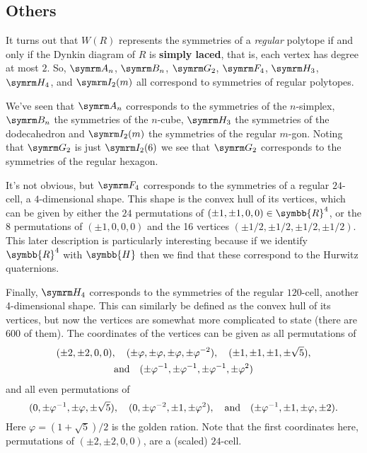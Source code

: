 \documentclass[fleqn, a4paper, openany]{memoir}
\newcommand{\define}[1]{\textbf{#1}}
\newcommand{\reals}{\symbb{R}}
\newcommand{\quaternions}{\symbb{H}}
\newcommand{\qand}{\quad\text{and}\quad}
\begin{document}
    \subsection{Others}
    It turns out that \(W(R)\) represents the symmetries of a \emph{regular} polytope if and only if the Dynkin diagram of \(R\) is \define{simply laced}, that is, each vertex has degree at most \(2\).
    So, \(\A[n]\), \(\B[n]\), \(\G[2]\), \(\F[4]\), \(\H[3]\), \(\H[4]\), and \(\I[2][m]\) all correspond to symmetries of regular polytopes.
    
    We've seen that \(\A[n]\) corresponds to the symmetries of the \(n\)-simplex, \(\B[n]\) the symmetries of the \(n\)-cube, \(\H[3]\) the symmetries of the dodecahedron and \(\I[2][m]\) the symmetries of the regular \(m\)-gon.
    Noting that \(\G[2]\) is just \(\I[2][6]\) we see that \(\G[2]\) corresponds to the symmetries of the regular hexagon.
    
    It's not obvious, but \(\F[4]\) corresponds to the symmetries of a regular \(24\)-cell, a \(4\)-dimensional shape.
    This shape is the convex hull of its vertices, which can be given by either the \(24\) permutations of \((\pm 1, \pm 1, 0, 0) \in \reals^{4}\), or the \(8\) permutations of \((\pm 1, 0, 0, 0)\) and the 16 vertices \((\pm 1/2, \pm 1/2, \pm 1/2, \pm 1/2)\).
    This later description is particularly interesting because if we identify \(\reals^4\) with \(\quaternions\) then we find that these correspond to the Hurwitz quaternions.
    
    Finally, \(\H[4]\) corresponds to the symmetries of the regular \(120\)-cell, another 4-dimensional shape.
    This can similarly be defined as the convex hull of its vertices, but now the vertices are somewhat more complicated to state (there are 600 of them).
    The coordinates of the vertices can be given as all permutations of
    \begin{gather}
        (\pm 2, \pm 2, 0, 0), \quad (\pm \varphi, \pm \varphi, \pm \varphi, \pm \varphi^{-2}), \quad (\pm 1, \pm 1, \pm 1, \pm \sqrt{5}), \notag\\
        \text{and}\quad (\pm \varphi^{-1}, \pm \varphi^{-1}, \pm \varphi^{-1}, \pm \varphi^2)
    \end{gather}
    and all even permutations of
    \begin{equation}
        (0, \pm \varphi^{-1}, \pm \varphi, \pm \sqrt{5}), \quad (0, \pm \varphi^{-2}, \pm 1, \pm \varphi^2), \qand (\pm \varphi^{-1}, \pm 1, \pm \varphi, \pm 2). \notag
    \end{equation}
    Here \(\varphi = (1 + \sqrt{5})/2\) is the golden ration.
    Note that the first coordinates here, permutations of \((\pm 2, \pm 2, 0, 0)\), are a (scaled) \(24\)-cell.
    
\end{document}

